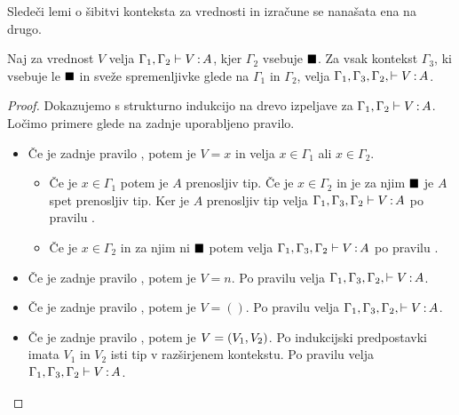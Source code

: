 Sledeči lemi o šibitvi konteksta za vrednosti in izračune se nanašata ena na drugo.

\begin{lema}\label{lem:weakening-values-bb}
	Naj za vrednost $V$ velja $\Gamma_1, \Gamma_2 \vdash V \mathinner{:} A$, kjer $\Gamma_2$ vsebuje $\blacksquare$.
	Za vsak kontekst $\Gamma_3$, ki vsebuje le $\blacksquare$ in sveže spremenljivke glede na $\Gamma_1$ in $\Gamma_2$, velja $\Gamma_1, \Gamma_3, \Gamma_2, \vdash V \mathinner{:} A$.
\end{lema}

\begin{proof}
	Dokazujemo s strukturno indukcijo na drevo izpeljave za $\Gamma_1, \Gamma_2 \vdash V \mathinner{:} A$.
	Ločimo primere glede na zadnje uporabljeno pravilo.
	
	\begin{itemize}
		\item[\sitem] Če je zadnje pravilo , potem je $V = x$ in velja $x \in \Gamma_1$ ali $x \in \Gamma_2$.
		\begin{itemize}
			\item Če je $x \in \Gamma_1$ potem je $A$ prenosljiv tip. Če je $x \in \Gamma_2$ in je za njim $\blacksquare$ je $A$ spet prenosljiv tip.
			Ker je $A$ prenosljiv tip velja $\Gamma_1, \Gamma_3, \Gamma_2 \vdash V \mathinner{:} A$ po pravilu .
			\item Če je $x \in \Gamma_2$ in za njim ni $\blacksquare$ potem velja $\Gamma_1, \Gamma_3, \Gamma_2 \vdash V \mathinner{:} A$ po pravilu .
		\end{itemize}
		
		\item Če je zadnje pravilo , potem je $V = n$. Po pravilu  velja $\Gamma_1, \Gamma_3, \Gamma_2, \vdash V \mathinner{:} A$.
		
		\item Če je zadnje pravilo , potem je $V = ()$. Po pravilu  velja $\Gamma_1, \Gamma_3, \Gamma_2, \vdash V \mathinner{:} A$.
		
		\item Če je zadnje pravilo , potem je $V =( V_1 , V_2 )$.
		Po indukcijski predpostavki imata $V_1$ in $V_2$ isti tip v razširjenem kontekstu.
		Po pravilu  velja $\Gamma_1, \Gamma_3, \Gamma_2 \vdash V \mathinner{:} A$.
		

\end{itemize}
\end{proof}
